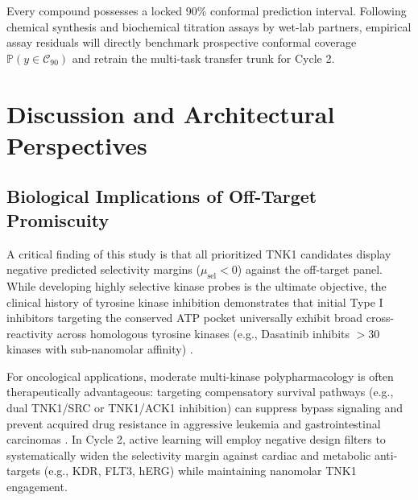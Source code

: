 \documentclass[journal]{IEEEtran}
\begin{document}
Every compound possesses a locked 90\% conformal prediction interval. Following chemical synthesis and biochemical titration assays by wet-lab partners, empirical assay residuals will directly benchmark prospective conformal coverage $\mathbb{P}(y \in \mathcal{C}_{90})$ and retrain the multi-task transfer trunk for Cycle 2.

\section{Discussion and Architectural Perspectives}

\subsection{Biological Implications of Off-Target Promiscuity}
A critical finding of this study is that all prioritized TNK1 candidates display negative predicted selectivity margins ($\mu_{\text{sel}} < 0$) against the off-target panel. While developing highly selective kinase probes is the ultimate objective, the clinical history of tyrosine kinase inhibition demonstrates that initial Type I inhibitors targeting the conserved ATP pocket universally exhibit broad cross-reactivity across homologous tyrosine kinases (e.g., Dasatinib inhibits $>30$ kinases with sub-nanomolar affinity) \cite{davis2011kinome, klaeger2017target}.

For oncological applications, moderate multi-kinase polypharmacology is often therapeutically advantageous: targeting compensatory survival pathways (e.g., dual TNK1/SRC or TNK1/ACK1 inhibition) can suppress bypass signaling and prevent acquired drug resistance in aggressive leukemia and gastrointestinal carcinomas \cite{chan2021tnk1}. In Cycle 2, active learning will employ negative design filters to systematically widen the selectivity margin against cardiac and metabolic anti-targets (e.g., KDR, FLT3, hERG) while maintaining nanomolar TNK1 engagement.
\end{document}
